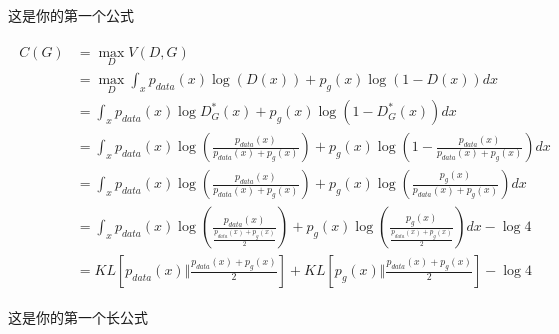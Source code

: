 \documentclass[a4paper, twoside]{ltxdoc}
\numberwithin{equation}{section} %
\begin{document}
{这是你的第一个公式

\begin{equation}\label{equ:1.2}
\begin{aligned}
\begin{split}
C(G) &= \max_D V(D,G) \\
&= \max_D \int_x p_{data}(x) \log{(D(x))} + p_g(x) \log{(1-D(x))} dx \\
&= \int_x p_{data}(x) \log{D_G^*(x)} + p_g(x) \log{(1-D_G^*(x))} dx \\
&= \int_x p_{data}(x) \log{(\frac{p_{data}(x)}{p_{data}(x)+p_g(x)})} + p_g(x) \log{(1-\frac{p_{data}(x)}{p_{data}(x)+p_g(x)})} dx \\
&= \int_x p_{data}(x) \log{(\frac{p_{data}(x)}{p_{data}(x)+p_g(x)})} + p_g(x) \log{(\frac{p_{g}(x)}{p_{data}(x)+p_g(x)})} dx \\
&= \int_x p_{data}(x) \log{(\frac{p_{data}(x)}{\frac{p_{data}(x)+p_g(x)}{2}})} + p_g(x) \log{(\frac{p_{g}(x)}{\frac{p_{data}(x)+p_g(x)}{2}})} dx - \log{4} \\
&= KL[p_{data}(x) \Vert \frac{p_{data}(x)+p_g(x)}{2}] + KL[p_g(x) \Vert \frac{p_{data}(x)+p_g(x)}{2}] - \log{4}
\end{split}
\end{aligned}
\end{equation}

这是你的第一个长公式

}
\end{document}
